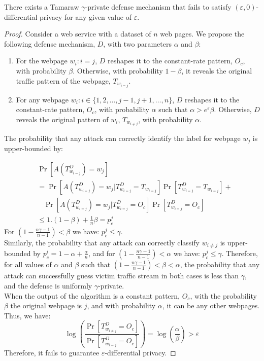 \begin{lemma-numbered}
  There exists a Tamaraw $\gamma$-private defense mechanism that fails to satisfy $(\varepsilon, 0)$-differential privacy for any given value of $\varepsilon$.
\end{lemma-numbered}
\begin{proof}
    Consider a web service with a dataset of $n$ web pages.
    We propose the following defense mechanism, $D$, with two parameters $\alpha$ and $\beta$:
    \begin{enumerate}
    \item For the webpage $w_i: i=j$, $D$ reshapes it to the constant-rate pattern, $O_c$, with probability $\beta$. Otherwise, with probability $1-\beta$, it reveals the original traffic pattern of the webpage, $T_{w_{i=j}}$.
    \item For any webpage $w_i: i \in \{1, 2, \dots, j-1, j+1, \dots, n\}$, $D$ reshapes it to the constant-rate pattern, $O_c$, with probability $\alpha$ such that $\alpha > {e^{\varepsilon}}\beta$. Otherwise, $D$ reveals the original pattern of $w_i$, $T_{w_{i\neq j}}$, with probability $\alpha$.
    \end{enumerate}
    The probability that any attack can correctly identify the label for webpage $w_j$ is upper-bounded by:

    \begin{align*}
      & \Pr[A(T^{D}_{w_{i=j}}) = w_j]
      \\
      & = \Pr[A(T^D_{w_{i=j}}) = w_j | T^D_{w_{i=j}}=T_{w_{i=j}}]\Pr[T^D_{w_{i=j}}=T_{w_{i=j}}] +
      \\
      &~~~~\Pr[A(T^D_{w_{i=j}}) = w_j | T^D_{w_{i=j}}=O_c]\Pr[T^D_{w_{i=j}}=O_c]
      \\
      & \leq  1.(1-\beta) + \frac{1}{n}\beta = p_c^j
    \end{align*}
    For $(1- \frac{n\gamma - 1}{n-1}) < \beta$ we have: $p_c^j \leq \gamma$.
    \\
    Similarly, the probability that any attack can correctly classify $w_{i\neq j}$ is upper-bounded by $p_c^i = 1-\alpha + \frac{\alpha}{n}$, and for $(1- \frac{n\gamma - 1}{n-1}) < \alpha$ we have: $p_c^j \leq \gamma$.
    Therefore, for all values of $\alpha$ and $\beta$ such that $(1- \frac{n\gamma -
    1}{n-1}) < \beta < \alpha$, the probability that any attack can successfully
    guess victim traffic stream in both cases is less than $\gamma$, and
    the defense is uniformly $\gamma$-private.
    \\
    When the output of the algorithm is a constant pattern, $O_{c}$, with the probability $\beta$ the original webpage is $j$, and with probability $\alpha$, it can be any other webpages. Thus, we have:
    \begin{equation*}
    \log(\frac{\Pr[T_{w_{i\neq j}}^{D}=O_{c}]}{\Pr[T_{w_{i=j}}^{D}=O_{c}]})
    = \log(\frac{\alpha}{\beta}) > \varepsilon
    \end{equation*}
  Therefore, it fails to guarantee $\varepsilon$-differential privacy.
\end{proof}


